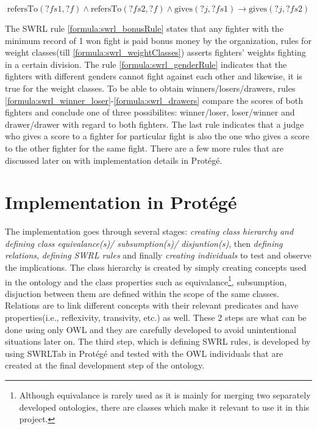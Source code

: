 \documentclass[a4paper]{article}
\begin{document}
\begin{equation}
		\text{refersTo}(?fs1, ?f) \land \text{refersTo}(?fs2, ?f) \land \text{gives}(?j, ?fs1) \rightarrow \text{gives}(?j, ?fs2)
	\label{formula:swrl_judge_score}
\end{equation}

The SWRL rule \ref{formula:swrl_bonusRule} states that any fighter with the minimum record of 1 won fight is paid bonus money by the organization, rules for weight classes(till 
\ref{formula:swrl_weightClasses}) asserts fighters' weights fighting in a certain division. The rule \ref{formula:swrl_genderRule} indicates that the fighters with different genders 
cannot fight against each other and likewise, it is true for the weight classes. To be able to obtain winners/losers/drawers, rules \ref{formula:swrl_winner_loser}-\ref{formula:swrl_drawers} 
compare the scores of both fighters and conclude one of three possibilites: winner/loser, loser/winner and drawer/drawer with regard to both fighters. The last rule indicates that a judge 
who gives a score to a fighter for particular fight is also the one who gives a score to the other fighter for the same fight. There are a few more rules that are discussed later on with 
implementation details in Prot\'eg\'e.

\section{Implementation in Prot\'eg\'e}
The implementation goes through several stages: \textit{creating class hierarchy and defining class equivalance(s)/ subsumption(s)/ disjuntion(s)}, then \textit{defining relations}, 
\textit{defining SWRL rules} and finally \textit{creating individuals} to test and observe the implications. The class hierarchy is created by simply creating concepts used in the 
ontology and the class properties such as equivalance\footnote{Although equivalance is rarely used as it is mainly for merging two separately developed ontologies, there are classes 
which make it relevant to use it in this project.}, subsumption, disjuction between them are defined within the scope of the same classes. Relations are to link different concepts 
with their relevant predicates and have properties(i.e., reflexivity, transivity, etc.) as well. These 2 steps are what can be done using only OWL and they are carefully developed 
to avoid unintentional situations later on. The third step, which is defining SWRL rules, is developed by using SWRLTab in Prot\'eg\'e and tested with the OWL individuals that are 
created at the final development step of the ontology.
\end{document}
